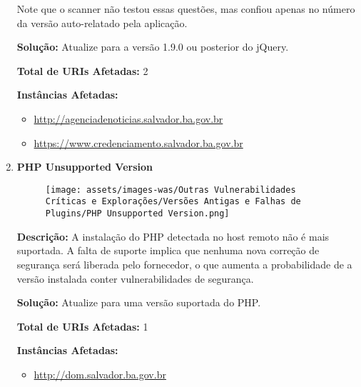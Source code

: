 \documentclass[a4paper,12pt]{article}
\begin{document}
\begin{enumerate}
    Note que o scanner não testou essas questões, mas confiou apenas no número da versão auto-relatado pela aplicação.

\textbf{Solução:} Atualize para a versão 1.9.0 ou posterior do jQuery.

\textbf{Total de URIs Afetadas:} 2

\textbf{Instâncias Afetadas:}
\begin{itemize}
    \item \url{http://agenciadenoticias.salvador.ba.gov.br}
    \item \url{https://www.credenciamento.salvador.ba.gov.br}
\end{itemize}

\item \textbf{PHP Unsupported Version}

                        \begin{figure}[h!]
                        \centering
                        \texttt{[image: assets/images-was/Outras Vulnerabilidades Críticas e Explorações/Versões Antigas e Falhas de Plugins/PHP Unsupported Version.png]}
                        \end{figure}
                        \FloatBarrier
                        \textbf{Descrição:} A instalação do PHP detectada no host remoto não é mais suportada. A falta de suporte implica que nenhuma nova correção de segurança será liberada pelo fornecedor, o que aumenta a probabilidade de a versão instalada conter vulnerabilidades de segurança.

\textbf{Solução:} Atualize para uma versão suportada do PHP.

\textbf{Total de URIs Afetadas:} 1

\textbf{Instâncias Afetadas:}
\begin{itemize}
    \item \url{http://dom.salvador.ba.gov.br}
\end{itemize}

\end{enumerate}
\end{document}
